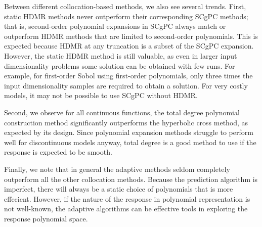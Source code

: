 Between different collocation-based methods, we also see several trends.  First, static HDMR methods never outperform their
corresponding SCgPC methods; that is, second-order polynomial expansions in SCgPC always match or outperform HDMR methods
that are limited to second-order polynomials.  This is expected because HDMR at any truncation is a subset of the SCgPC
expansion.  However, the static HDMR method is still valuable, as even in larger input dimensionality problems some solution
can be obtained with few runs.  For example, for first-order Sobol using first-order polynomials, only three times the input
dimensionality samples are required to obtain a solution.  For very costly models, it may not be possible to use SCgPC without
HDMR.

Second, we observe for all continuous functions, the total degree polynomial construction method significantly outperforms
the hyperbolic cross method, as expected by its design.  Since polynomial expansion methods struggle to perform well for
discontinuous models anyway, total degree is a good method to use if the response is expected to be smooth.

Finally, we note that in general the adaptive methods seldom completely outperform all the other collocation methods.  Because the
prediction algorithm is imperfect, there will always be a static choice of polynomials that is more effecient.  However, if
the nature of the response in polynomial representation is not well-known, the adaptive algorithms can be effective tools in
exploring the response polynomial space.

